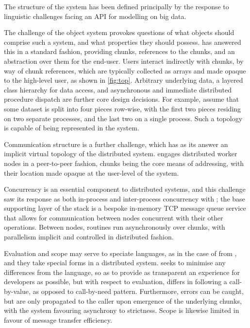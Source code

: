 The structure of the \lsr{} system has been defined principally by the response to linguistic challenges facing an API for modelling on big data.

The challenge of the object system provokes questions of what objects should comprise such a system, and what properties they should possess.
\lsr{} has answered this in a standard fashion, providing chunks, references to the chunks, and an abstraction over them for the end-user.
Users interact indirectly with chunks, by way of chunk references, which are typically collected as arrays and made opaque to the high-level user, as shown in \cref{fig:top}.
Arbitrary underlying data, a layered class hierarchy for data access, and asynchronous and immediate distributed procedure dispatch are further core design decisions.
For example, assume that some dataset is split into four pieces row-wise, with the first two pieces residing on two separate processes, and the last two on a single process.
Such a topology is capable of being represented in the \lsr{} system.


Communication structure is a further challenge, which has as its answer an implicit virtual topology of the distributed system.
\lsr{} engages distributed worker nodes in a peer-to-peer fashion, chunks being the core means of addressing, with their location made opaque at the user-level of the system.

Concurrency is an essential component to distributed systems, and this challenge saw its response as both in-process and inter-process concurrency with \lsr{}; the base supporting layer of the \lsr{} stack is a bespoke in-memory TCP message queue service that allows for communication between nodes concurrent with their other operations.
Between nodes, routines run asynchronously over chunks, with parallelism implicit and controlled in distributed fashion.

Evaluation and scope may serve to speciate languages, as in the case of \R{} from , and they take special forms in a distributed system.
\lsr{} seeks to minimise any differences from the \R{} language, so as to provide as transparent an experience for developers as possible, but with respect to evaluation, differs in following a call-by-value, as opposed to call-by-need pattern.
Furthermore, errors can be caught, but are only propagated to the caller upon emergence of the underlying chunks, with the system favouring asynchrony to strictness.
Scope is likewise limited in favour of message transfer efficiency.

